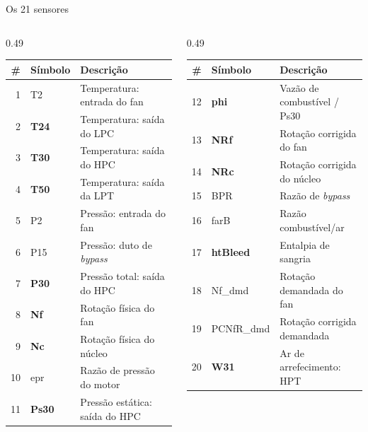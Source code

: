 \documentclass[aspectratio=169,10pt]{beamer}
\begin{document}
\begin{frame}{Os 21 sensores}
  \footnotesize
  \begin{columns}[T]
    \begin{column}{0.49\textwidth}
      \begin{tabular}{@{}rll@{}}
        \toprule
        \# & Símbolo & Descrição \\
        \midrule
        1 & T2 & Temperatura: entrada do fan \\
        2 & \textbf{T24} & Temperatura: saída do LPC \\
        3 & \textbf{T30} & Temperatura: saída do HPC \\
        4 & \textbf{T50} & Temperatura: saída da LPT \\
        5 & P2 & Pressão: entrada do fan \\
        6 & P15 & Pressão: duto de \emph{bypass} \\
        7 & \textbf{P30} & Pressão total: saída do HPC \\
        8 & \textbf{Nf} & Rotação física do fan \\
        9 & \textbf{Nc} & Rotação física do núcleo \\
        10 & epr & Razão de pressão do motor \\
        11 & \textbf{Ps30} & Pressão estática: saída do HPC \\
        \bottomrule
      \end{tabular}
    \end{column}
    \begin{column}{0.49\textwidth}
      \begin{tabular}{@{}rll@{}}
        \toprule
        \# & Símbolo & Descrição \\
        \midrule
        12 & \textbf{phi} & Vazão de combustível / Ps30 \\
        13 & \textbf{NRf} & Rotação corrigida do fan \\
        14 & \textbf{NRc} & Rotação corrigida do núcleo \\
        15 & BPR & Razão de \emph{bypass} \\
        16 & farB & Razão combustível/ar \\
        17 & \textbf{htBleed} & Entalpia de sangria \\
        18 & Nf\_dmd & Rotação demandada do fan \\
        19 & PCNfR\_dmd & Rotação corrigida demandada \\
        20 & \textbf{W31} & Ar de arrefecimento: HPT \\

\end{tabular}
\end{column}
\end{columns}
\end{frame}
\end{document}
